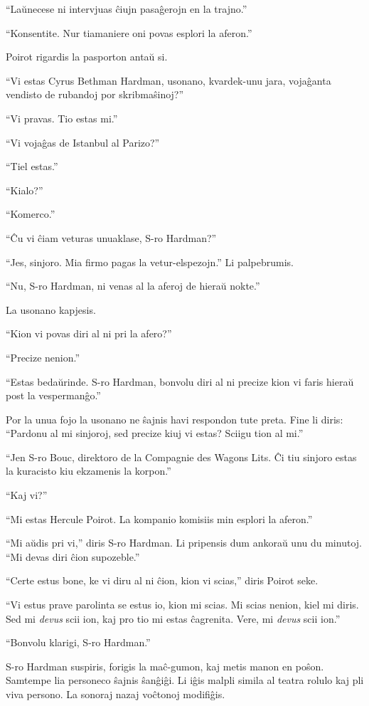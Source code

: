 ``Laŭnecese ni intervjuas ĉiujn pasaĝerojn en la trajno.''

``Konsentite. Nur tiamaniere oni povas esplori la aferon.''

Poirot rigardis la pasporton antaŭ si.

``Vi estas Cyrus Bethman Hardman, usonano, kvardek-unu jara, vojaĝanta vendisto de rubandoj por skribmaŝinoj?''

``Vi pravas. Tio estas mi.''

``Vi vojaĝas de Istanbul al Parizo?''

``Tiel estas.''

``Kialo?''

``Komerco.''

``Ĉu vi ĉiam veturas unuaklase, S-ro Hardman?''

``Jes, sinjoro. Mia firmo pagas la vetur-elspezojn.'' Li palpebrumis.

``Nu, S-ro Hardman, ni venas al la aferoj de hieraŭ nokte.''

La usonano kapjesis.

``Kion vi povas diri al ni pri la afero?''

``Precize nenion.''

``Estas bedaŭrinde. S-ro Hardman, bonvolu diri al ni precize kion vi faris hieraŭ post la vespermanĝo.''

Por la unua fojo la usonano ne ŝajnis havi respondon tute preta. Fine li diris: ``Pardonu al mi sinjoroj, sed precize kiuj vi estas? Sciigu tion al mi.''

``Jen S-ro Bouc, direktoro de la Compagnie des Wagons Lits. Ĉi tiu sinjoro estas la kuracisto kiu ekzamenis la korpon.''

``Kaj vi?''

``Mi estas Hercule Poirot. La kompanio komisiis min esplori la aferon.''

``Mi aŭdis pri vi,'' diris S-ro Hardman. Li pripensis dum ankoraŭ unu du minutoj. ``Mi devas diri ĉion supozeble.''

``Certe estus bone, ke vi diru al ni ĉion, kion vi scias,'' diris Poirot seke.

``Vi estus prave parolinta se estus io, kion mi scias. Mi scias nenion, kiel mi diris. Sed mi \emph{devus} scii ion, kaj pro tio mi estas ĉagrenita. Vere, mi \emph{devus} scii ion.''

``Bonvolu klarigi, S-ro Hardman.''

S-ro Hardman suspiris, forigis la maĉ-gumon, kaj metis manon en poŝon. Samtempe lia personeco ŝajnis ŝanĝiĝi. Li iĝis malpli simila al teatra rolulo kaj pli viva persono. La sonoraj nazaj voĉtonoj modifiĝis.

